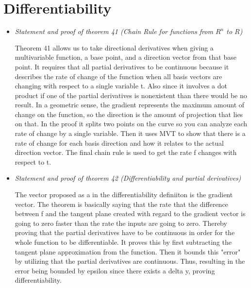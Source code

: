 \documentclass{article}
\begin{document}
\section*{Differentiability}

\begin{itemize}
      \item{} \emph{Statement and proof of theorem 41 (Chain Rule for functions from $R^n$ to $R$)}

            \quad{}
            Theorem 41 allows us to take directional derivatives when giving a multivariable function, a base point, and a direction vector from that base point.
            It requires that all partial derivatives to be continuous because it describes the rate of change of the function when all basis vectors are changing with respect to a single variable t.
            Also since it involves a dot product if one of the partial derivatives is nonexistent than there would be no result.
            In a geometric sense, the gradient represents the maximum amount of change on the function, so the direction is the amount of projection that lies on that.
            In the proof it splits two points on the curve so you can analyze each rate of change by a single variable.
            Then it uses MVT to show that there is a rate of change for each basis direction and how it relates to the actual direction vector.
            The final chain rule is used to get the rate f changes with respect to t.

            \vspace{0.5cm}

      \item{} \emph{Statement and proof of theorem 42 (Differentiability and partial derivatives)}

            \quad{}
            The vector proposed as a in the differentiability definiiton is the gradient vector.
            The theorem is basically saying that the rate that the difference between f and the tangent
            plane created with regard to the gradient vector is going to zero faster than the rate the inputs
            are going to zero. Thereby proving that the partial derivatives have to be continuous in order for
            the whole function to be differentiable. It proves this by first subtracting the tangent plane approximation
            from the function. Then it bounds this "error" by utilizing that the partial derivatives are continuous.
            Thus, resulting in the error being bounded by epsilon since there exists a delta y, proving differentiability.
\end{itemize}
\end{document}
